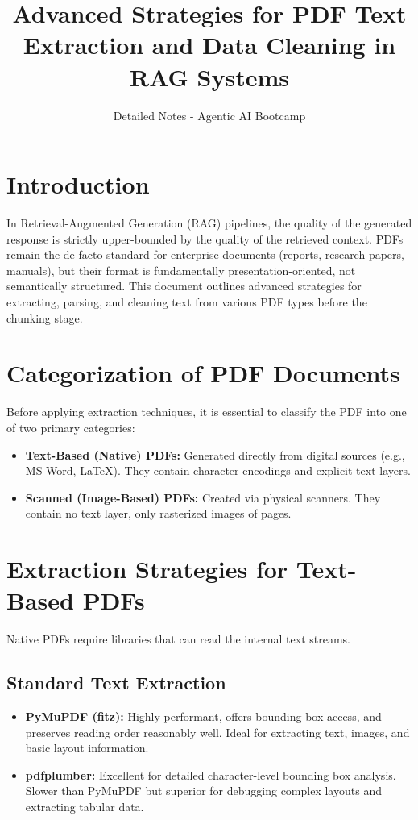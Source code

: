 \documentclass[12pt, a4paper]{article}
\title{\textbf{Advanced Strategies for PDF Text Extraction and Data Cleaning in RAG Systems}}
\author{Detailed Notes - Agentic AI Bootcamp}
\date{}
\begin{document}
\maketitle
\tableofcontents
\newpage

\section{Introduction}
In Retrieval-Augmented Generation (RAG) pipelines, the quality of the generated response is strictly upper-bounded by the quality of the retrieved context. PDFs remain the de facto standard for enterprise documents (reports, research papers, manuals), but their format is fundamentally presentation-oriented, not semantically structured. This document outlines advanced strategies for extracting, parsing, and cleaning text from various PDF types before the chunking stage.

\section{Categorization of PDF Documents}
Before applying extraction techniques, it is essential to classify the PDF into one of two primary categories:
\begin{itemize}
    \item \textbf{Text-Based (Native) PDFs:} Generated directly from digital sources (e.g., MS Word, LaTeX). They contain character encodings and explicit text layers.
    \item \textbf{Scanned (Image-Based) PDFs:} Created via physical scanners. They contain no text layer, only rasterized images of pages.
\end{itemize}

\section{Extraction Strategies for Text-Based PDFs}
Native PDFs require libraries that can read the internal text streams.

\subsection{Standard Text Extraction}
\begin{itemize}
    \item \textbf{PyMuPDF (fitz):} Highly performant, offers bounding box access, and preserves reading order reasonably well. Ideal for extracting text, images, and basic layout information.
    \item \textbf{pdfplumber:} Excellent for detailed character-level bounding box analysis. Slower than PyMuPDF but superior for debugging complex layouts and extracting tabular data.
\end{itemize}
\end{document}
